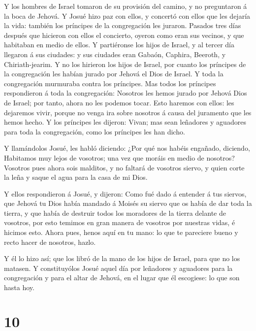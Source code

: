  Y los hombres de Israel tomaron de su provisión del
camino, y no preguntaron á la boca de Jehová.  Y Josué hizo
paz con ellos, y concertó con ellos que les dejaría la vida: también los
príncipes de la congregación les juraron.  Pasados tres
días después que hicieron con ellos el concierto, oyeron como eran sus
vecinos, y que habitaban en medio de ellos.  Y partiéronse
los hijos de Israel, y al tercer día llegaron á sus ciudades: y sus
ciudades eran Gabaón, Caphira, Beeroth, y Chiriath-jearim. 
Y no los hirieron los hijos de Israel, por cuanto los príncipes de la
congregación les habían jurado por Jehová el Dios de Israel. Y toda la
congregación murmuraba contra los príncipes.  Mas todos los
príncipes respondieron á toda la congregación: Nosotros les hemos jurado
por Jehová Dios de Israel; por tanto, ahora no les podemos tocar.
 Esto haremos con ellos: les dejaremos vivir, porque no
venga ira sobre nosotros á causa del juramento que les hemos hecho.
 Y los príncipes les dijeron: Vivan; mas sean leñadores y
aguadores para toda la congregación, como los príncipes les han dicho.

 Y llamándolos Josué, les habló diciendo: ¿Por qué nos
habéis engañado, diciendo, Habitamos muy lejos de vosotros; una vez que
moráis en medio de nosotros?  Vosotros pues ahora sois
malditos, y no faltará de vosotros siervo, y quien corte la leña y saque
el agua para la casa de mi Dios.

 Y ellos respondieron á Josué, y dijeron: Como fué dado á
entender á tus siervos, que Jehová tu Dios había mandado á Moisés su
siervo que os había de dar toda la tierra, y que había de destruir todos
los moradores de la tierra delante de vosotros, por esto temimos en gran
manera de vosotros por nuestras vidas, é hicimos esto. 
Ahora pues, henos aquí en tu mano: lo que te pareciere bueno y recto
hacer de nosotros, hazlo.

 Y él lo hizo así; que los libró de la mano de los hijos de
Israel, para que no los matasen.  Y constituyólos Josué
aquel día por leñadores y aguadores para la congregación y para el altar
de Jehová, en el lugar que él escogiese: lo que son hasta hoy.

\hypertarget{section-9}{%
\section{10}\label{section-9}}

